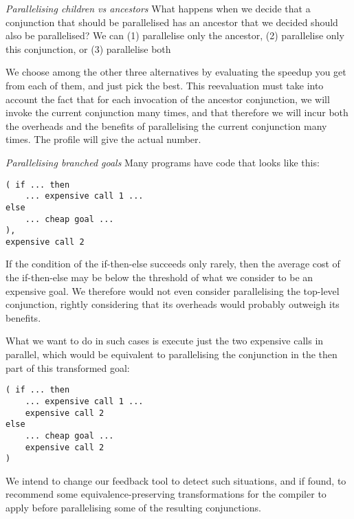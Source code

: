 
\emph{Parallelising children vs ancestors}
What happens when we decide that a conjunction that should be parallelised
has an ancestor that we decided should also be parallelised?
We can
(1) parallelise only the ancestor,
(2) parallelise only this conjunction, or
(3) parallelise both


We choose among the other three alternatives
by evaluating the speedup you get from each of them, and just pick the best.
This reevaluation must take into account
the fact that for each invocation of the ancestor conjunction,
we will invoke the current conjunction many times,
and that therefore we will incur both the overheads and the benefits
of parallelising the current conjunction many times.
The profile will give the actual number.



\emph{Parallelising branched goals}
Many programs have code that looks like this:
\begin{verbatim}
( if ... then
    ... expensive call 1 ...
else
    ... cheap goal ...
),
expensive call 2
\end{verbatim}
If the condition of the if-then-else succeeds only rarely,
then the average cost of the if-then-else
may be below the threshold of what we consider to be an expensive goal.
We therefore would not even consider
parallelising the top-level conjunction,
rightly considering that its overheads would probably outweigh its benefits.

What we want to do in such cases
is execute just the two expensive calls in parallel,
which would be equivalent to parallelising the conjunction
in the then part of this transformed goal:
\begin{verbatim}
( if ... then
    ... expensive call 1 ...
    expensive call 2
else
    ... cheap goal ...
    expensive call 2
)
\end{verbatim}
We intend to change our feedback tool to detect such situations,
and if found, to recommend
some equivalence-preserving transformations for the compiler to apply
before parallelising some of the resulting conjunctions.

